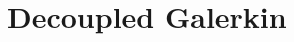 \documentclass[10pt, a4paper]{report}
\begin{document}
\tableofcontents{}

\chapter{Decoupled Galerkin}


\printbibliography
\end{document}
